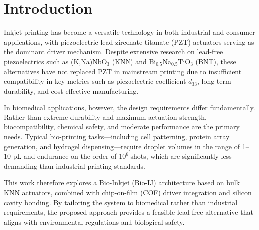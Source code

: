 \section{Introduction}
Inkjet printing has become a versatile technology in both industrial and
consumer applications, with piezoelectric lead zirconate titanate (PZT)
actuators serving as the dominant driver mechanism.
Despite extensive research on lead-free piezoelectrics such as
(K,Na)NbO$_3$ (KNN) and Bi$_{0.5}$Na$_{0.5}$TiO$_3$ (BNT), these
alternatives have not replaced PZT in mainstream printing due to
insufficient compatibility in key metrics such as piezoelectric
coefficient $d_{33}$, long-term durability, and cost-effective
manufacturing.

In biomedical applications, however, the design requirements differ
fundamentally.
Rather than extreme durability and maximum actuation strength,
biocompatibility, chemical safety, and moderate performance are the
primary needs.
Typical bio-printing tasks---including cell patterning, protein array
generation, and hydrogel dispensing---require droplet volumes in the
range of 1--10 pL and endurance on the order of $10^6$ shots, which are
significantly less demanding than industrial printing standards.

This work therefore explores a Bio-Inkjet (Bio-IJ) architecture based on
bulk KNN actuators, combined with chip-on-film (COF) driver integration
and silicon cavity bonding.
By tailoring the system to biomedical rather than industrial
requirements, the proposed approach provides a feasible lead-free
alternative that aligns with environmental regulations and biological
safety.
